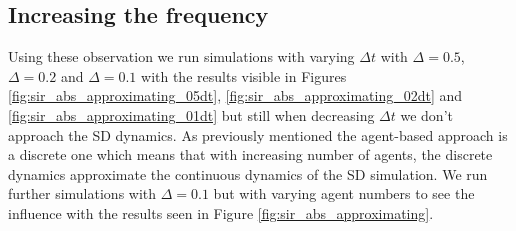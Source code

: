 \subsection{Increasing the frequency}
Using these observation we run simulations with varying $\Delta t$ with $\Delta = 0.5$, $\Delta = 0.2$ and $\Delta = 0.1$ with the results visible in Figures \ref{fig:sir_abs_approximating_05dt}, \ref{fig:sir_abs_approximating_02dt} and \ref{fig:sir_abs_approximating_01dt} but still when decreasing $\Delta t$ we don't approach the SD dynamics. As previously mentioned the agent-based approach is a discrete one which means that with increasing number of agents, the discrete dynamics approximate the continuous dynamics of the SD simulation. We run further simulations with $\Delta = 0.1$ but with varying agent numbers to see the influence with the results seen in Figure \ref{fig:sir_abs_approximating}.

